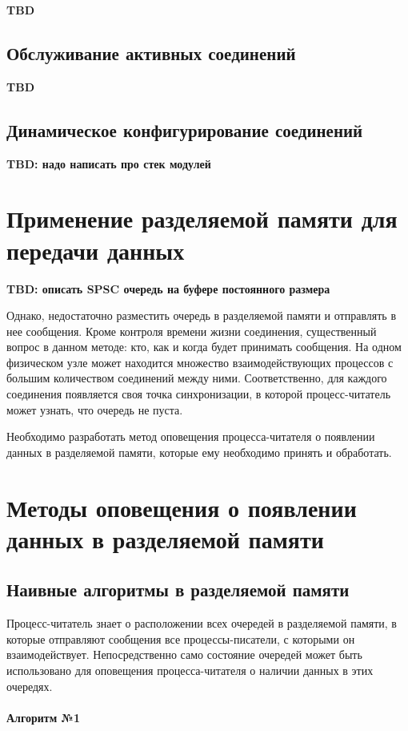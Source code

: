 \textbf{TBD}

\subsection{Обслуживание активных соединений}

\textbf{TBD}

\subsection{Динамическое конфигурирование соединений}
\textbf{TBD: надо написать про стек модулей}


\section{Применение разделяемой памяти для передачи данных}

\textbf{TBD: описать SPSC очередь на буфере постоянного размера}

Однако, недостаточно разместить очередь в разделяемой памяти и отправлять в нее сообщения. Кроме контроля времени жизни соединения, существенный вопрос в данном методе: кто, как и когда будет принимать сообщения. На одном физическом узле может находится множество взаимодействующих процессов с большим количеством соединений между ними. Соответственно, для каждого соединения появляется своя точка синхронизации, в которой процесс-читатель может узнать, что очередь не пуста.

Необходимо разработать метод оповещения процесса-читателя о появлении данных в разделяемой памяти, которые ему необходимо принять и обработать.

\section{Методы оповещения о появлении данных в разделяемой памяти}

\subsection{Наивные алгоритмы в разделяемой памяти}

Процесс-читатель знает о расположении всех очередей в разделяемой памяти, в которые отправляют сообщения все процессы-писатели, с которыми он взаимодействует. Непосредственно само состояние очередей может быть использовано для оповещения процесса-читателя о наличии данных в этих очередях.

\paragraph{Алгоритм №1}

